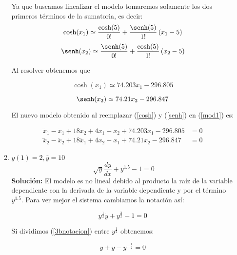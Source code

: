 \documentclass[letterpaper, 12pt]{article}
\begin{document}
\begin{enumerate}
\begin{enumerate}
Ya que buscamos linealizar el modelo tomaremos solamente los dos primeros términos de la sumatoria, es decir:
\begin{equation}
    \notag
    \cosh(x_1)\simeq \frac{\cosh(5)}{0!}+\frac{\senh(5)}{1!}\left(x_1-5\right)
\end{equation}
\begin{equation}
    \notag
    \senh(x_2)\simeq \frac{\senh(5)}{0!}+\frac{\cosh(5)}{1!}\left(x_2-5\right)
\end{equation}

Al resolver obtenemos que

\begin{equation}
    \cosh(x_1)\simeq 74.203x_1-296.805
    \label{cosh}
\end{equation}

\begin{equation}
    \senh(x_2)\simeq 74.21x_2-296.847
    \label{senh}
\end{equation}

El nuevo modelo obtenido al reemplazar (\ref{cosh}) y (\ref{senh}) en (\ref{mod1}) es:

\begin{equation}
\begin{split}
    \dddot{x}_1-\ddot{x}_1+18\ddot{x}_2+4x_1+x_2+74.203x_1-296.805 &= 0 \\ \dddot{x}_2-\ddot{x}_2+18\ddot{x}_1+4x_2+x_1+74.21x_2-296.847 &= 0
\end{split}
\end{equation}

\item $y(1)=2,\bar{y}=10$
\begin{equation}
     \sqrt[]{y}\frac{dy}{dx}+y^{1.5}-1 = 0
\end{equation}
\textbf{Solución:}
El modelo es no lineal debido al producto la raíz de la variable dependiente con la derivada de la variable dependiente y por el término $y^1.5$.
Para ver mejor el sistema cambiamos la notación así:

\begin{equation}
     y^{\frac{1}{2}}\dot{y}+y^{\frac{3}{2}}-1 = 0
     \label{3bnotacion}
\end{equation}

Si dividimos (\ref{3bnotacion}) entre $y^{\frac{1}{2}}$ obtenemos:

\begin{equation}
     \dot{y}+y-y^{-\frac{1}{2}} = 0
     \label{3bdivid}
\end{equation}


\end{enumerate}
\end{enumerate}
\end{document}
